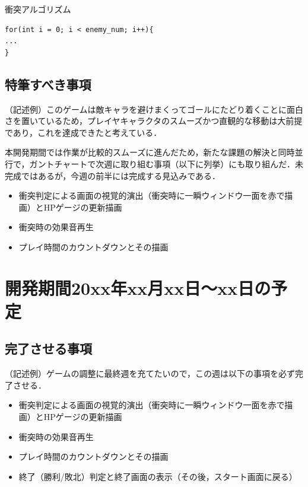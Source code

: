 \documentclass{jsarticle}
\begin{document}
\clearpage

\begin{itembox}[l]{衝突アルゴリズム}
\begin{verbatim}
for(int i = 0; i < enemy_num; i++){
...
}
\end{verbatim}
\end{itembox}



\subsection{特筆すべき事項}
（記述例）このゲームは敵キャラを避けまくってゴールにたどり着くことに面白さを置いているため，プレイヤキャラクタのスムーズかつ直観的な移動は大前提であり，これを達成できたと考えている．

本開発期間では作業が比較的スムーズに進んだため，新たな課題の解決と同時並行で，ガントチャートで次週に取り組む事項（以下に列挙）にも取り組んだ．未完成ではあるが，今週の前半には完成する見込みである．

\begin{itemize}
\item 衝突判定による画面の視覚的演出（衝突時に一瞬ウィンドウ一面を赤で描画）とHPゲージの更新描画
\item 衝突時の効果音再生
\item プレイ時間のカウントダウンとその描画
\end{itemize}


\section{開発期間20xx年xx月xx日～xx日の予定}

\subsection{完了させる事項}
（記述例）ゲームの調整に最終週を充てたいので，この週は以下の事項を必ず完了させる．

\begin{itemize}
\item 衝突判定による画面の視覚的演出（衝突時に一瞬ウィンドウ一面を赤で描画）とHPゲージの更新描画
\item 衝突時の効果音再生
\item プレイ時間のカウントダウンとその描画
\item 終了（勝利/敗北）判定と終了画面の表示（その後，スタート画面に戻る）
\end{itemize}
\end{document}
